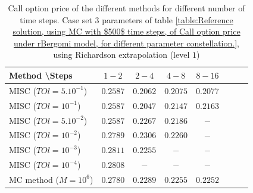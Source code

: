 \documentclass[11pt]{article}
\begin{document}
\begin{table}[h!]
	\centering
	\begin{tabular}{l*{6}{c}r}
		Method \textbackslash  Steps    &$1-2$         & $2-4$ & $4-8$ & $8-16$\\
		\hline
		MISC ($TOl=5.10^{-1}$)& $0.2587$  & $0.2062$ & $0.2075$ & $0.2077$ \\
		MISC ($TOl=10^{-1}$)  &$0.2587$  &$0.2047$ & $0.2147$ & $0.2163$  \\
		MISC ($TOl=5.10^{-2}$)  & $0.2587$ & $0.2267$ & $0.2186$ & $-$   \\
		MISC ($TOl=10^{-2}$)  & $0.2789$ &$0.2306$ & $0.2260$ & $-$  \\
		MISC ($TOl=10^{-3}$)  & $0.2811$ &$0.2255$ & $-$ & $-$  \\
		MISC ($TOl=10^{-4}$)  & $0.2808$ &$-$ & $-$ & $-$  \\
		\hline
		MC method ($M=10^6$)  &$   0.2780$ & $0.2289$ & $ 0.2255$ & $0.2252$ \\
		\hline
	\end{tabular}
	\caption{Call option price of the different methods for different number of time steps. Case set $3$ parameters of table \ref{table:Reference solution, using MC with $500$ time steps, of Call option price under rBergomi model, for different parameter constellation.}, using Richardson extrapolation (level $1$)}
	\label{table:  Call option price of the different methods for different number of time steps. Case set $3$ parameter, using Richardson extrapolation (level $1$)}
\end{table}
\end{document}
